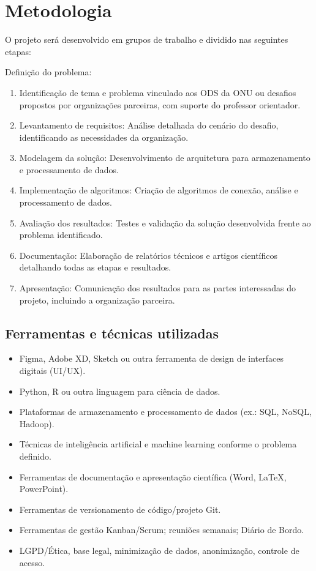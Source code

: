 \chapter{Metodologia}
\label{cap:metodologia}

O projeto será desenvolvido em grupos de trabalho e dividido nas seguintes etapas:

Definição do problema: 

\begin{enumerate}
    \item Identificação de tema e problema vinculado aos ODS da ONU ou desafios propostos por organizações parceiras, com suporte do professor orientador.
    \item Levantamento de requisitos: Análise detalhada do cenário do desafio, identificando as necessidades da organização.
    \item Modelagem da solução: Desenvolvimento de arquitetura para armazenamento e processamento de dados.
    \item Implementação de algoritmos: Criação de algoritmos de conexão, análise e processamento de dados.
    \item Avaliação dos resultados: Testes e validação da solução desenvolvida frente ao problema identificado.
    \item Documentação: Elaboração de relatórios técnicos e artigos científicos detalhando todas as etapas e resultados.
    \item Apresentação: Comunicação dos resultados para as partes interessadas do projeto, incluindo a organização parceira.
\end{enumerate}


\section{Ferramentas e técnicas utilizadas}

\begin{itemize}
    \item Figma, Adobe XD, Sketch ou outra ferramenta de design de interfaces digitais (UI/UX).
    \item Python, R ou outra linguagem para ciência de dados.
    \item Plataformas de armazenamento e processamento de dados (ex.: SQL, NoSQL, Hadoop).
    \item Técnicas de inteligência artificial e machine learning conforme o problema definido.
    \item Ferramentas de documentação e apresentação científica (Word, LaTeX, PowerPoint).
    \item Ferramentas de versionamento de código/projeto Git.
    \item Ferramentas de gestão Kanban/Scrum; reuniões semanais; Diário de Bordo.
    \item LGPD/Ética, base legal, minimização de dados, anonimização, controle de acesso.
\end{itemize}

